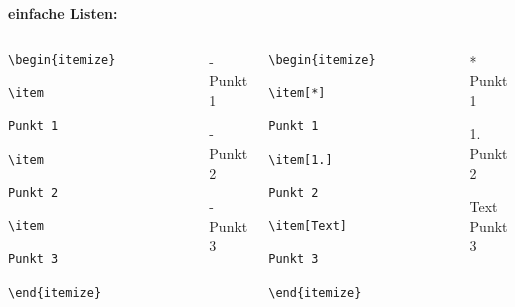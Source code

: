 \documentclass["WS\space 16-17\space -\space LaTeX-Kurs\space -\space Praesentation\space -\space 2.tex"]{subfiles}
\begin{document}
\begin{frame}[fragile]
    \textbf{\large einfache Listen:}\vspace{0.1cm}
    \begin{columns}[t]
            \Code*
                \begin{lstlisting}[gobble=20]
                    \begin{itemize}
                        \item
                            Punkt 1
                        \item
                            Punkt 2
                        \item
                            Punkt 3
                    \end{itemize}
                \end{lstlisting}
            \Ausgabe\vspace{-0.2cm}
                \begin{outputbox}
                    \begin{itemize}
                        \item[-]
                            Punkt 1
                        \item[-]
                            Punkt 2
                        \item[-]
                            Punkt 3
                    \end{itemize}
                \end{outputbox}
            \Code*
                \begin{lstlisting}[gobble=20]
                    \begin{itemize}
                        \item[*]
                            Punkt 1
                        \item[1.]
                            Punkt 2
                        \item[Text]
                            Punkt 3
                    \end{itemize}
                \end{lstlisting}
            \Ausgabe\vspace{-0.2cm}
                \begin{outputbox}
                    \begin{itemize}
                        \item[*]
                            Punkt 1
                        \item[1.]
                            Punkt 2
                        \item[Text]
                            Punkt 3
                    \end{itemize}
                \end{outputbox}
    \end{columns}
\end{frame}
\end{document}
